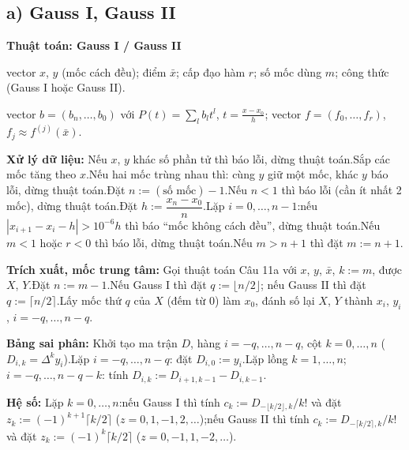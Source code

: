 \documentclass[11pt,a4paper]{article}
\newenvironment{thuattoan}[1]
  {\par\medskip\noindent\textbf{Thuật toán: #1}\begin{description}[style=standard,align=left,leftmargin=4.3em,labelwidth=3.9em,labelsep=0.4em,itemsep=1pt,topsep=3pt,font=\normalfont\bfseries]}
  {\end{description}}
\newcommand{\thut}{\newline\hspace*{1.2em}}
\begin{document}
\subsection{a) Gauss I, Gauss II}
\begin{thuattoan}{Gauss I / Gauss II}
\item[Input:] vector $x$, $y$ (mốc cách đều); điểm $\bar x$; cấp đạo hàm $r$; số mốc dùng $m$; công thức (Gauss I hoặc Gauss II).
\item[Output:] vector $b=(b_n,\dots,b_0)$ với $P(t)=\sum_lb_lt^l$, $t=\frac{x-x_0}{h}$; vector $f=(f_0,\dots,f_r)$, $f_j\approx f^{(j)}(\bar x)$.
\item[Bước 0:] \textbf{Xử lý dữ liệu:} Nếu $x$, $y$ khác số phần tử thì báo lỗi, dừng thuật toán.\newline Sắp các mốc tăng theo $x$.\newline Nếu hai mốc trùng nhau thì: cùng $y$ giữ một mốc, khác $y$ báo lỗi, dừng thuật toán.\newline Đặt $n:=(\text{số mốc})-1$.\newline Nếu $n<1$ thì báo lỗi (cần ít nhất 2 mốc), dừng thuật toán.\newline Đặt $h:=\dfrac{x_n-x_0}{n}$.\newline Lặp $i=0,\dots,n-1$:\thut nếu $|x_{i+1}-x_i-h|>10^{-6}h$ thì báo ``mốc không cách đều'', dừng thuật toán.\newline Nếu $m<1$ hoặc $r<0$ thì báo lỗi, dừng thuật toán.\newline Nếu $m>n+1$ thì đặt $m:=n+1$.
\item[Bước 1:] \textbf{Trích xuất, mốc trung tâm:} Gọi thuật toán Câu 11a với $x$, $y$, $\bar x$, $k:=m$, được $X$, $Y$.\newline Đặt $n:=m-1$.\newline Nếu Gauss I thì đặt $q:=\lfloor n/2\rfloor$; nếu Gauss II thì đặt $q:=\lceil n/2\rceil$.\newline Lấy mốc thứ $q$ của $X$ (đếm từ $0$) làm $x_0$, đánh số lại $X$, $Y$ thành $x_i$, $y_i$, $i=-q,\dots,n-q$.
\item[Bước 2:] \textbf{Bảng sai phân:} Khởi tạo ma trận $D$, hàng $i=-q,\dots,n-q$, cột $k=0,\dots,n$ ($D_{i,k}=\Delta^ky_i$).\newline Lặp $i=-q,\dots,n-q$: đặt $D_{i,0}:=y_i$.\newline Lặp lồng $k=1,\dots,n$; $i=-q,\dots,n-q-k$: tính $D_{i,k}:=D_{i+1,k-1}-D_{i,k-1}$.
\item[Bước 3:] \textbf{Hệ số:} Lặp $k=0,\dots,n$:\thut nếu Gauss I thì tính $c_k:=D_{-\lfloor k/2\rfloor,k}/k!$ và đặt $z_k:=(-1)^{k+1}\lceil k/2\rceil$ ($z=0,1,-1,2,\dots$);\thut nếu Gauss II thì tính $c_k:=D_{-\lceil k/2\rceil,k}/k!$ và đặt $z_k:=(-1)^{k}\lceil k/2\rceil$ ($z=0,-1,1,-2,\dots$).

\end{thuattoan}
\end{document}

